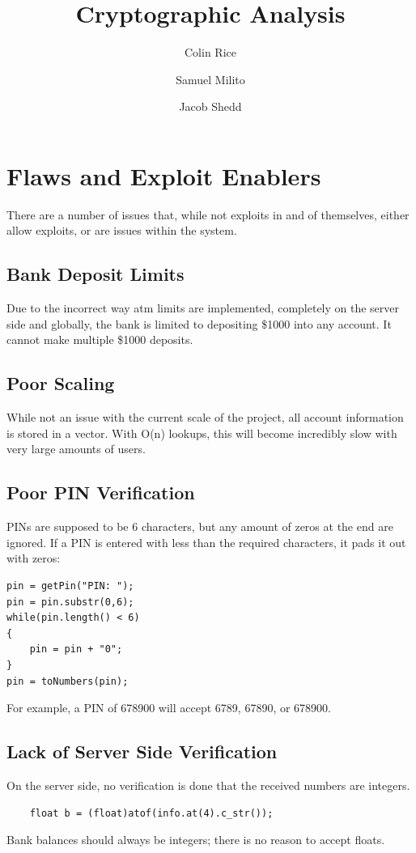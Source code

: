 \documentclass{article}
\begin{document}
\title{Cryptographic Analysis}
\author{Colin Rice
    \and Samuel Milito
    \and Jacob Shedd}

\maketitle

\section{Flaws and Exploit Enablers}
There are a number of issues that, while not exploits in and of themselves, either allow exploits, or are issues within the system.

\subsection{Bank Deposit Limits}
Due to the incorrect way atm limits are implemented, completely on the server side and globally, the bank is limited to depositing \$1000 into any account. It cannot make multiple \$1000 deposits.

\subsection{Poor Scaling}
While not an issue with the current scale of the project, all account information is stored in a vector. With O(n) lookups, this will become incredibly slow with very large amounts of users.

\subsection{Poor PIN Verification}
PINs are supposed to be 6 characters, but any amount of zeros at the end are ignored. If a PIN is entered with less than the required characters, it pads it out with zeros:
\begin{lstlisting}
pin = getPin("PIN: ");
pin = pin.substr(0,6);
while(pin.length() < 6)
{
    pin = pin + "0";
}
pin = toNumbers(pin);
\end{lstlisting}
For example, a PIN of 678900 will accept 6789, 67890, or 678900.

\subsection{Lack of Server Side Verification}
On the server side, no verification is done that the received numbers are integers.
\begin{lstlisting}
    float b = (float)atof(info.at(4).c_str());
\end{lstlisting}
Bank balances should always be integers; there is no reason to accept floats.
\end{document}
